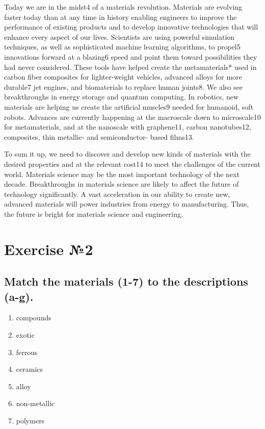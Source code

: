  Today we are in the midst4 of a materials revolution. Materials are evolving faster today than at
any time in history enabling engineers to improve the performance of existing products and to
develop innovative technologies that will enhance every aspect of our lives. Scientists are using
powerful simulation techniques, as well as sophisticated machine learning algorithms, to propel5
innovations forward at a blazing6 speed and point them toward possibilities they had never
considered. These tools have helped create the metamaterials* used in carbon fiber composites for
lighter-weight vehicles, advanced alloys for more durable7 jet engines, and biomaterials to replace
human joints8. We also see breakthroughs in energy storage and quantum computing. In robotics,
new materials are helping us create the artificial muscles9 needed for humanoid, soft robots.
Advances are currently happening at the macroscale down to microscale10 for metamaterials, and at
the nanoscale with graphene11, carbon nanotubes12, composites, thin metallic- and semiconductor-
based films13.

 To sum it up, we need to discover and develop new kinds of materials with the desired properties
and at the relevant cost14 to meet the challenges of the current world. Materials science may be the
most important technology of the next decade. Breakthroughs in materials science are likely to affect
the future of technology significantly. A vast acceleration in our ability to create new, advanced
materials will power industries from energy to manufacturing. Thus, the future is bright for materials
science and engineering.

\section{Exercise №2}

\subsection*{Match the materials (1-7) to the descriptions (a-g).}
\begin{enumerate}
      \item compounds
      \item exotic
      \item ferrous
      \item ceramics
      \item alloy
      \item non-metallic
      \item polymers
\end{enumerate}

